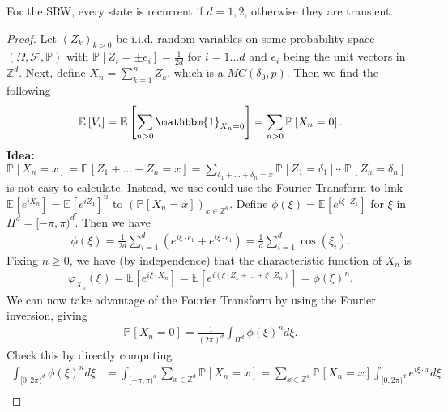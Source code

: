 \begin{theorem}[Polya]
	For the SRW, every state is recurrent if $d=1,2$, otherwise they are transient.
\end{theorem}
\begin{proof}
	Let $(Z_k)_{k> 0}$ be i.i.d. random variables on some probability space $(\Omega, \mathcal{F}, \mathbb{P})$ with $\mathbb{P}_{} \left[ Z_i = \pm e_i \right] = \frac{1}{2d}$ for $i= 1 \ldots d$ and $e_i$ being the unit vectors in $\mathbb{Z}^{d}$. Next, define $X_n = \sum_{k=1}^{n} Z_k$, which is a $MC(\delta_0, p)$. Then we find the following
	\begin{align}
		\mathbb{E}_{} \left[ V_i \right] = \mathbb{E}_{} \left[ \sum_{n> 0}^{} \mathbbm{1}_{X_n =0}  \right] = \sum_{n> 0}^{} \mathbb{P}_{} \left[ X_n = 0 \right] .
	\end{align}
	\textbf{Idea:} $\mathbb{P}_{} \left[ X_n=x \right]  = \mathbb{P}_{} \left[ Z_1+ \ldots + Z_n = x \right] = \sum_{\delta_1 + \ldots + \delta_n =x}^{} \mathbb{P}_{} \left[ Z_1 = \delta_1 \right] \cdots \mathbb{P}_{} \left[ Z_n = \delta_n \right]  $ is not easy to calculate. Instead, we use could use the Fourier Transform to link $\mathbb{E}_{} \left[ e^{i X_n} \right] = \mathbb{E}_{} \left[ e^{iZ_1} \right] ^n $ to $(\mathbb{P}_{} \left[ X_n =x\right] )_{x \in \mathbb{Z}^d}$.
	Define $\phi(\xi) = \mathbb{E}_{} \left[ e^{i \xi \cdot Z_1} \right] $ for $\xi$ in $\Pi^d = [-\pi, \pi)^d$. Then we have
	\begin{align}
		\phi(\xi) = \frac{1}{2d} \sum_{i=1}^{d} (e^{i \xi \cdot e_1} + e^{i \xi \cdot e_1}) = \frac{1}{d} \sum_{i=1}^{d} \cos(\xi_i)
	.\end{align}
	Fixing $n\geq 0$, we have (by independence) that the characteristic function of $X_n$ is 
	\begin{align}
		\varphi_{X_n}(\xi) = \mathbb{E}_{} \left[ e^{i \xi \cdot X_n} \right]  = \mathbb{E}_{} \left[ e ^{i ( \xi \cdot Z_1 + \ldots + \xi \cdot Z_n)} \right] = \phi(\xi)^n. 	
	\end{align}
We can now take advantage of the Fourier Transform by using the Fourier inversion, giving
\begin{align}
	\mathbb{P}_{} \left[ X_n = 0 \right] = \frac{1}{(2 \pi) ^d} \int_{\Pi^d}^{} \phi(\xi)^n d\xi.
\end{align}
Check this by directly computing
\begin{align}
	\int_{[0, 2\pi)^d}^{} \phi(\xi)^n d\xi &= \int_{[-\pi, \pi)^d}^{} \sum_{x \in \mathbb{Z}^d}^{} \mathbb{P}_{} \left[ X_n = x \right] = \sum_{x \in \mathbb{Z}^d}^{} \mathbb{P}_{} \left[ X_n = x \right] \int_{[0, 2 \pi)^d}^{} e^{i \xi \cdot x} d\xi  \\

\end{align}
\end{proof}
